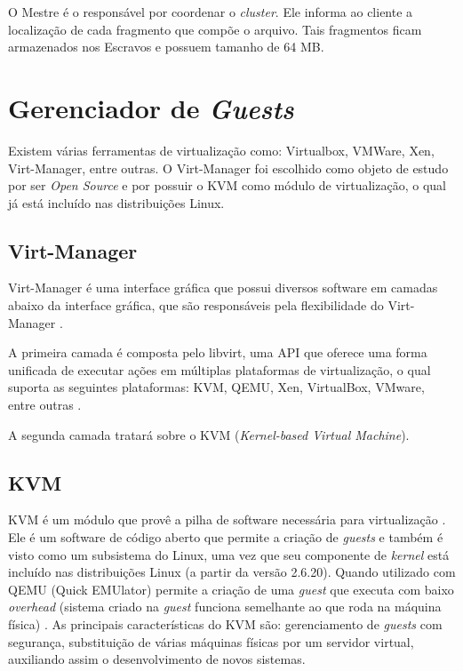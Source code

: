 O Mestre é o responsável por coordenar o \textit{cluster}. Ele informa ao cliente a localização de cada fragmento que compõe o arquivo. Tais fragmentos ficam armazenados nos Escravos e possuem tamanho de 64 MB. 


\section{Gerenciador de \textit{Guests}}

Existem várias ferramentas de virtualização como: Virtualbox, VMWare, Xen, Virt-Manager, entre outras. O Virt-Manager foi escolhido como objeto de estudo por ser \textit{Open Source} e por possuir o KVM como módulo de virtualização, o qual já está incluído nas distribuições Linux.

\subsection{Virt-Manager}

Virt-Manager é uma interface gráfica que possui diversos software em camadas abaixo da interface gráfica, que são responsáveis pela flexibilidade do Virt-Manager \cite{PabloHess}.

    A primeira camada é composta pelo libvirt, uma API que oferece uma forma unificada de executar ações em múltiplas plataformas de virtualização, o qual suporta as seguintes plataformas: KVM, QEMU, Xen, VirtualBox, VMware, entre outras \cite{libvirt}.

    A segunda camada tratará sobre o KVM (\textit{Kernel-based Virtual Machine}).
    
    \subsection{KVM}
   KVM é um módulo que provê a pilha de software necessária para virtualização \cite{kvm}. Ele é um software de código aberto que permite a criação de \textit{guests} e também é visto como um subsistema do Linux, uma vez que seu componente de \textit{kernel} está incluído nas distribuições Linux (a partir da versão 2.6.20). Quando utilizado com QEMU (Quick EMUlator) permite a criação de uma \textit{guest} que executa com baixo \textit{overhead} (sistema criado na \textit{guest} funciona semelhante ao que roda na máquina física) \cite{KVM2}.
    As principais características do KVM são: gerenciamento de \textit{guests} com segurança, substituição de várias máquinas físicas por um servidor virtual, auxiliando assim o desenvolvimento de novos sistemas.

